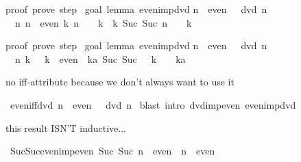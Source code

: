 \begin{isabellebody}
\begin{isamarkuptext}
proof\ {\isacharparenleft}prove{\isacharparenright}{\isacharcolon}\ step\ {}\isanewline
\isanewline
goal\ {\isacharparenleft}lemma\ even{\isacharunderscore}imp{\isacharunderscore}dvd{\isacharparenright}{\isacharcolon}\isanewline
n\ {\isasymin}\ even\ {\isasymLongrightarrow}\ {\isacharhash}{}\ dvd\ n\isanewline
\ {}{\isachardot}\ {\isasymAnd}n{\isachardot}\ {\isasymlbrakk}n\ {\isasymin}\ even{\isacharsemicolon}\ {\isasymexists}k{\isachardot}\ n\ {\isacharequal}\ {\isacharhash}{}\ {\isacharasterisk}\ k{\isasymrbrakk}\ {\isasymLongrightarrow}\ {\isasymexists}k{\isachardot}\ Suc\ {\isacharparenleft}Suc\ n{\isacharparenright}\ {\isacharequal}\ {\isacharhash}{}\ {\isacharasterisk}\ k

proof\ {\isacharparenleft}prove{\isacharparenright}{\isacharcolon}\ step\ {}\isanewline
\isanewline
goal\ {\isacharparenleft}lemma\ even{\isacharunderscore}imp{\isacharunderscore}dvd{\isacharparenright}{\isacharcolon}\isanewline
n\ {\isasymin}\ even\ {\isasymLongrightarrow}\ {\isacharhash}{}\ dvd\ n\isanewline
\ {}{\isachardot}\ {\isasymAnd}n\ k{\isachardot}\ {\isacharhash}{}\ {\isacharasterisk}\ k\ {\isasymin}\ even\ {\isasymLongrightarrow}\ {\isasymexists}ka{\isachardot}\ Suc\ {\isacharparenleft}Suc\ {\isacharparenleft}{\isacharhash}{}\ {\isacharasterisk}\ k{\isacharparenright}{\isacharparenright}\ {\isacharequal}\ {\isacharhash}{}\ {\isacharasterisk}\ ka%
\end{isamarkuptext}%
%
\begin{isamarkuptext}%
no iff-attribute because we don't always want to use it%
\end{isamarkuptext}%
\ even{\isacharunderscore}iff{\isacharunderscore}dvd{\isacharcolon}\ {\isachardoublequote}{\isacharparenleft}n\ {\isasymin}\ even{\isacharparenright}\ {\isacharequal}\ {\isacharparenleft}{\isacharhash}{}\ dvd\ n{\isacharparenright}{\isachardoublequote}\isanewline
{}\ {\isacharparenleft}blast\ intro{\isacharcolon}\ dvd{\isacharunderscore}imp{\isacharunderscore}even\ even{\isacharunderscore}imp{\isacharunderscore}dvd{\isacharparenright}\isanewline
{}%
\begin{isamarkuptext}%
this result ISN'T inductive...%
\end{isamarkuptext}%
\ Suc{\isacharunderscore}Suc{\isacharunderscore}even{\isacharunderscore}imp{\isacharunderscore}even{\isacharcolon}\ {\isachardoublequote}Suc\ {\isacharparenleft}Suc\ n{\isacharparenright}\ {\isasymin}\ even\ {\isasymLongrightarrow}\ n\ {\isasymin}\ even{\isachardoublequote}\isanewline

\end{isabellebody}
